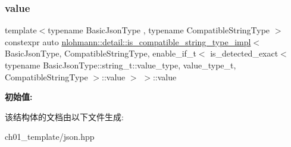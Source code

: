 \subsubsection{\texorpdfstring{value}{value}}
{\footnotesize\ttfamily template$<$typename Basic\+Json\+Type , typename Compatible\+String\+Type $>$ \\
constexpr auto \mbox{\hyperlink{structnlohmann_1_1detail_1_1is__compatible__string__type__impl}{nlohmann\+::detail\+::is\+\_\+compatible\+\_\+string\+\_\+type\+\_\+impl}}$<$ Basic\+Json\+Type, Compatible\+String\+Type, enable\+\_\+if\+\_\+t$<$ is\+\_\+detected\+\_\+exact$<$ typename Basic\+Json\+Type\+::string\+\_\+t\+::value\+\_\+type, value\+\_\+type\+\_\+t, Compatible\+String\+Type $>$\+::value $>$ $>$\+::value\hspace{0.3cm}{\ttfamily [static]}}

{\bfseries 初始值\+:}
\begin{DoxyCode}{0}
\DoxyCodeLine{=}

\end{DoxyCode}


该结构体的文档由以下文件生成\+:\begin{DoxyCompactItemize}
\item 
ch01\+\_\+template/json.\+hpp\end{DoxyCompactItemize}
